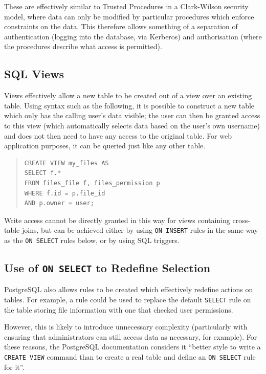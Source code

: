 \documentclass[12pt]{report}
\begin{document}
These are effectively similar to Trusted Procedures in a Clark-Wilson security model, where data can only be modified by particular procedures which enforce constraints on the data. This therefore allows something of a separation of authentication (logging into the database, via Kerberos) and authorisation (where the procedures describe what access is permitted).

\subsection{SQL Views}
Views effectively allow a new table to be created out of a view over an existing table. Using syntax such as the following, it is possible to construct a new table which only has the calling user's data visible; the user can then be granted access to this view (which automatically selects data based on the user's own username) and does not then need to have any access to the original table. For web application purposes, it can be queried just like any other table.

\begin{quote}
\begin{verbatim}
CREATE VIEW my_files AS
SELECT f.*
FROM files_file f, files_permission p
WHERE f.id = p.file_id
AND p.owner = user;
\end{verbatim}
\end{quote}

Write access cannot be directly granted in this way for views containing cross-table joins, but can be achieved either by using \texttt{ON INSERT} rules in the same way as the \texttt{ON SELECT} rules below, or by using SQL triggers\cite{postgres-CREATE_VIEW}.

\subsection{Use of \texttt{ON SELECT} to Redefine Selection}
PostgreSQL also allows rules to be created which effectively redefine actions on tables. For example, a rule could be used to replace the default \texttt{SELECT} rule on the table storing file information with one that checked user permissions.

However, this is likely to introduce unnecessary complexity (particularly with ensuring that administrators can still access data as necessary, for example). For these reasons, the PostgreSQL documentation considers it ``better style to write a \texttt{CREATE VIEW} command than to create a real table and define an \texttt{ON SELECT} rule for it''\cite{postgres-CREATE_RULE}.
\end{document}
